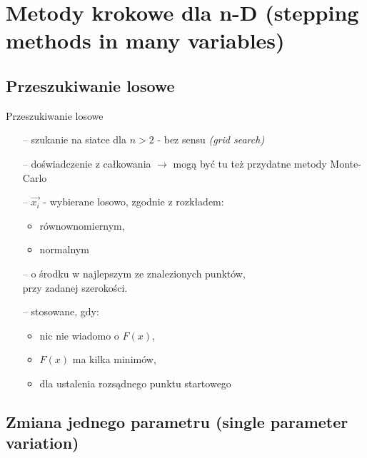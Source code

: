 \section{Metody krokowe dla n-D (stepping methods in many variables)}

\subsection{Przeszukiwanie losowe}

  \begin{frame}{Przeszukiwanie losowe} %

    \begin{block}{}
 	  \begin{itemize} %
 		\item[--] szukanie na siatce dla $n > 2$ - bez sensu \emph{(grid search)} %
 		\item[--] doświadczenie z całkowania $\rightarrow$ mogą być tu też przydatne metody Monte-Carlo %
 	  	\item[--] $\vec{x_i}$ - wybierane losowo, zgodnie z rozkładem: %
 	  	\begin{itemize}
 		  \item równownomiernym,
 		  \item normalnym
 	  	\end{itemize}
 	  	\item[--] o środku w najlepszym ze znalezionych punktów,
 	  	\\przy zadanej szerokości.
 	  	\item[--] stosowane, gdy: %
 	  	\begin{itemize}
 		  \item nic nie wiadomo o $F(x)$,
 		  \item $F(x)$ ma kilka minimów,
 		  \item dla ustalenia rozsądnego punktu startowego
 	  	\end{itemize}
 	  \end{itemize}
 	\end{block}

  \end{frame}

\subsection{Zmiana jednego parametru (single parameter variation)}

